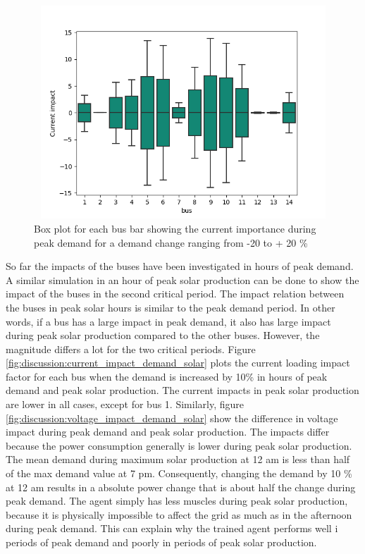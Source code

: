 \documentclass[class=book, crop=false, 11pt]{standalone}
\begin{document}
\begin{figure}[h]
    \center
\includegraphics[height=8cm, width=12cm]{figures/current_impact.png}
    \caption[size = 9]{Box plot for each bus bar showing the current importance during peak demand for a demand change ranging from -20 to + 20 \%}
    \label{fig:discussion:current_impact}
\end{figure}

So far the impacts of the buses have been investigated in hours of peak demand. A similar simulation in an hour of peak solar production can be done to show the impact of the buses in the second critical period. The impact relation between the buses in peak solar hours is similar to the peak demand period. In other words, if a bus has a large impact in peak demand, it also has large impact during peak solar production compared to the other buses. However, the magnitude differs a lot for the two critical periods. Figure \ref{fig:discussion:current_impact_demand_solar} plots the current loading impact factor for each bus when the demand is increased by 10\% in hours of peak demand and peak solar production. The current impacts in peak solar production are lower in all cases, except for bus 1. Similarly, figure     \ref{fig:discussion:voltage_impact_demand_solar} show the difference in voltage impact during peak demand and peak solar production. The impacts differ because the power consumption generally is lower during peak solar production. The mean demand during maximum solar production at 12 am is less than half of the max demand value at 7 pm. Consequently, changing the demand by 10 \% at 12 am results in a absolute power change that is about half the change during peak demand. The agent simply has less muscles during peak solar production, because it is physically impossible to affect the grid as much as in the afternoon during peak demand. This can explain why the trained agent performs well i periods of peak demand and poorly in periods of peak solar production.
\end{document}
